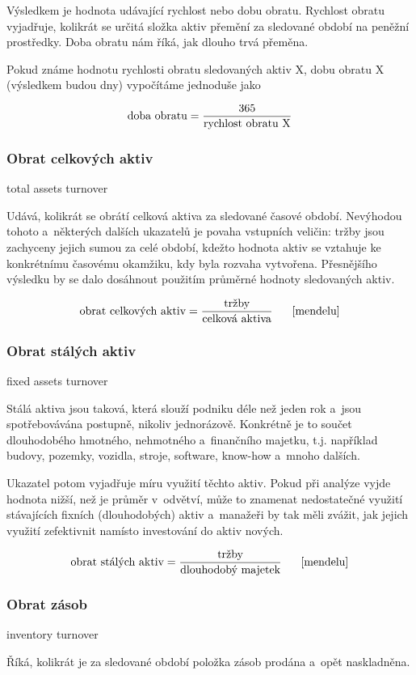 Výsledkem je hodnota udávající rychlost nebo dobu obratu. Rychlost obratu vyjadřuje, kolikrát se určitá složka aktiv přemění za sledované období na peněžní prostředky. Doba obratu nám říká, jak dlouho trvá přeměna.

Pokud známe hodnotu rychlosti obratu sledovaných aktiv X, dobu obratu X (výsledkem budou dny) vypočítáme jednoduše jako 

$$\text{doba obratu} = \dfrac{\text{365}}{\text{rychlost obratu X}}$$


\subsubsection{Obrat celkových aktiv}
total assets turnover

Udává, kolikrát se obrátí celková aktiva za sledované časové období. Nevýhodou tohoto a~některých dalších ukazatelů je povaha vstupních veličin: tržby jsou zachyceny jejich sumou za celé období, kdežto hodnota aktiv se vztahuje ke konkrétnímu časovému okamžiku, kdy byla rozvaha vytvořena. Přesnějšího výsledku by se dalo dosáhnout použitím průměrné hodnoty sledovaných aktiv. 

$$\vz{obrat celkových aktiv}{tržby}{celková aktiva} \scite{mendelu}$$

\subsubsection{Obrat stálých aktiv}
fixed assets turnover

Stálá aktiva jsou taková, která slouží podniku déle než jeden rok a~jsou spotřebovávána postupně, nikoliv jednorázově. Konkrétně je to součet dlouhodobého hmotného, nehmotného a~finančního majetku, t.j. například budovy, pozemky, vozidla, stroje, software, know-how a~mnoho dalších.

Ukazatel potom vyjadřuje míru využití těchto aktiv. Pokud při analýze vyjde hodnota nižší, než je průměr v~odvětví, může to znamenat nedostatečné využití stávajících fixních (dlouhodobých) aktiv a~manažeři by tak měli zvážit, jak jejich využití zefektivnit namísto investování do aktiv nových.

$$\vz{obrat stálých aktiv}{tržby}{dlouhodobý majetek} \scite{mendelu}$$

\subsubsection{Obrat zásob}
inventory turnover

Říká, kolikrát je za sledované období položka zásob prodána a~opět naskladněna.

